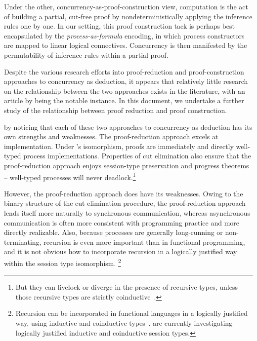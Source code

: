 Under the other, concurrency-as-proof-construction view, computation is the act of building a partial, cut-free proof by nondeterministically applying the inference rules one by one.
In our setting, this proof construction tack is perhaps best encapsulated by the \emph{process-as-formula} encoding, in which process constructors are mapped to linear logical connectives\autocite{Miller:ELP92}.
Concurrency is then manifested by the permutability of inference rules within a partial proof.


Despite the various research efforts into proof-reduction and proof-con\-struc\-tion approaches to concurrency as deduction, it appears that relatively little research on the relationship between the two approaches exists in the literature, with an article by \citeauthor{Cervesato+Scedrov:IC09} being the notable instance.\autocite{Cervesato+Scedrov:IC09}
In this document, we undertake a further study of the relationship between proof reduction and proof construction.

 by noticing that
%
each of these two approaches to concurrency as deduction has its own strengths and weaknesses.
The proof-reduction approach excels at
implementation.
Under \citeauthor{Caires+:MSCS16}'s isomorphism, proofs are immediately and directly well-typed process implementations.\autocites{Toninho+:ESOP13}{Griffith:UIUC16}
Properties of cut elimination also ensure that the proof-reduction approach enjoys session-type preservation and progress theorems -- well-typed processes will never deadlock.\footnote{But they can livelock or diverge in the presence of recursive types, unless those recursive types are strictly coinductive~\parencite{Derakhshan+Pfenning:LMCS20}.}

However, the proof-reduction approach does have its weaknesses.
Owing to the binary structure of the cut elimination procedure, the proof-reduction approach lends itself more naturally to synchronous communication, whereas asynchronous communication is often more consistent with programming practice and more directly realizable.
Also, because processes are generally long-running or non-terminating, recursion is even more important than in functional programming, and it is not obvious how to incorporate recursion in a logically justified way within the session type isomorphism.%
\footnote{Recursion can be incorporated in functional languages in a logically justified way, using inductive and coinductive types~\parencite{Mendler:LICS87}.
\Textcites{Derakhshan+Pfenning:LMCS20}{Somayyajula+Pfenning:20} are currently investigating logically justified inductive and coinductive session types.}

